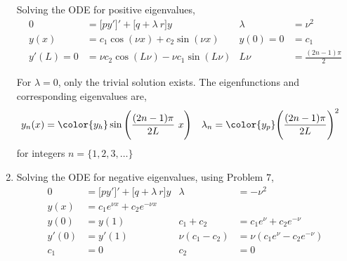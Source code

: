 \begin{enumerate}
          Solving the ODE for positive eigenvalues,
          \begin{align}
              0         & = \Big[ py' \Big]' + \Big[ q + \lambda\ r \Big] y &
              \lambda   & = \nu^2                                             \\
              y(x)      & = c_1 \cos(\nu x) + c_2 \sin(\nu x)               &
              y(0)= 0   & = c_1                                               \\
              y'(L) = 0 & = \nu c_2 \cos(L\nu) - \nu c_1 \sin(L\nu)         &
              L\nu      & = \frac{(2n-1)\pi}{2}
          \end{align}

          For $ \lambda = 0 $, only the trivial solution exists. The eigenfunctions and
          corresponding eigenvalues are,
          \begin{align}
              y_n(x)    & = \color{y_h} \sin\Bigg( \frac{(2n-1)\pi}{2L}\ x \Bigg) &
              \lambda_n & = \color{y_p} \Bigg( \frac{(2n-1)\pi}{2L} \Bigg)^2
          \end{align}
          for integers $ n = \{1,2,3,\dots\} $

    \item Solving the ODE for negative eigenvalues, using Problem $ 7 $,
          \begin{align}
              0               & = \Big[ py' \Big]' + \Big[ q + \lambda\ r \Big] y &
              \lambda         & = -\nu^2                                            \\
              y(x)            & = c_1 e^{\nu x} + c_2 e^{-\nu x}                    \\
              y(0)            & = y(1)                                            &
              c_1 + c_2       & = c_1 e^{\nu} + c_2 e^{-\nu}                        \\
              y'(0)           & = y'(1)                                           &
              \nu (c_1 - c_2) & = \nu (c_1 e^{\nu} - c_2 e^{-\nu})                  \\
              c_1             & = 0                                               &
              c_2             & = 0
          \end{align}


\end{enumerate}
